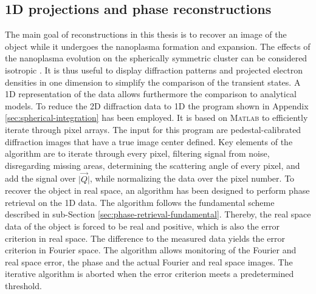 \subsection{1D projections and phase reconstructions}\label{sec:1d-proj-and-phase-reconstruction}
The main goal of reconstructions in this thesis is to recover an image of the object while it undergoes the nanoplasma formation and expansion. The effects of the nanoplasma evolution on the spherically symmetric cluster can be considered isotropic \citep{Gorkhover-2016-NatPho}. It is thus useful to display diffraction patterns and projected electron densities in one dimension to simplify the comparison of the transient states. A 1D representation of the data allows furthermore the comparison to analytical models. To reduce the 2D diffraction data to 1D the program shown in Appendix \ref{sec:spherical-integration} has been employed. It is based on \textsc{Matlab} to efficiently iterate through pixel arrays. The input for this program are pedestal-calibrated diffraction images that have a true image center defined. Key elements of the algorithm are to iterate through every pixel, filtering signal from noise, disregarding missing areas, determining the scattering angle of every pixel, and add the signal over $\lvert \vec{Q}\rvert$, while normalizing the data over the pixel number. To recover the object in real space, an algorithm has been designed to perform phase retrieval on the 1D data.
The algorithm follows the fundamental scheme described in sub-Section \ref{sec:phase-retrieval-fundamental}. Thereby, the real space data of the object is forced to be real and positive, which is also the error criterion in real space. The difference to the measured data yields the error criterion in Fourier space. The algorithm allows monitoring of the Fourier and real space error, the phase and the actual Fourier and real space images. The iterative algorithm is aborted when the error criterion meets a predetermined threshold.
%
%
%

